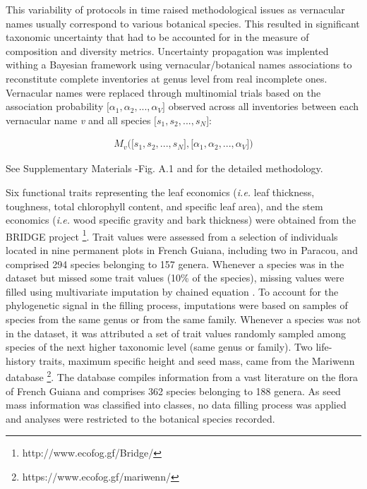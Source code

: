 \documentclass[fleqn,10pt]{ArtEcoFoG} %
\theoremstyle{definition}
\theoremstyle{definition}
\theoremstyle{definition}
\theoremstyle{remark}
\begin{document}
This variability of protocols in time raised methodological issues as
vernacular names usually correspond to various botanical species. This
resulted in significant taxonomic uncertainty that had to be accounted
for in the measure of composition and diversity metrics. Uncertainty
propagation was implented withing a Bayesian framework using
vernacular/botanical names associations to reconstitute complete
inventories at genus level from real incomplete ones. Vernacular names
were replaced through multinomial trials based on the association
probability \(\big[\alpha_1, \alpha_2,..., \alpha_V\big]\) observed
across all inventories between each vernacular name \emph{v} and all
species \(\big[s_1, s_2,..., s_N\big]\):

\begin{align}
M_v\Big(\big[s_1, s_2,..., s_N\big],\big[\alpha_1, \alpha_2,..., \alpha_V\big]\Big) \nonumber
\end{align}

See Supplementary Materials -Fig. A.1 and \citet{Aubry-Kientz2013} for
the detailed methodology.

Six functional traits representing the leaf economics (\emph{i.e.} leaf
thickness, toughness, total chlorophyll content, and specific leaf
area), and the stem economics (\emph{i.e.} wood specific gravity and
bark thickness) were obtained from the BRIDGE project \footnote{http://www.ecofog.gf/Bridge/}.
Trait values were assessed from a selection of individuals located in
nine permanent plots in French Guiana, including two in Paracou, and
comprised 294 species belonging to 157 genera. Whenever a species was in
the dataset but missed some trait values (10\% of the species), missing
values were filled using multivariate imputation by chained equation
\citep{Mice2011}. To account for the phylogenetic signal in the filling
process, imputations were based on samples of species from the same
genus or from the same family. Whenever a species was not in the
dataset, it was attributed a set of trait values randomly sampled among
species of the next higher taxonomic level (same genus or family). Two
life-history traits, maximum specific height and seed mass, came from
the Mariwenn database \footnote{https://www.ecofog.gf/mariwenn/}. The
database compiles information from a vast literature on the flora of
French Guiana \citep{Ollivier2007} and comprises 362 species belonging
to 188 genera. As seed mass information was classified into classes, no
data filling process was applied and analyses were restricted to the
botanical species recorded.
\end{document}
